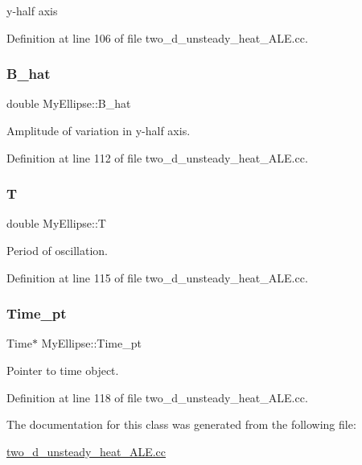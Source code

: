 y-\/half axis 



Definition at line 106 of file two\+\_\+d\+\_\+unsteady\+\_\+heat\+\_\+\+A\+L\+E.\+cc.

\mbox{\label{classMyEllipse_a39d06488447d80f16b80ed8915edf3e3}} 
\subsubsection{\texorpdfstring{B\+\_\+hat}{B\_hat}}
{\footnotesize\ttfamily double My\+Ellipse\+::\+B\+\_\+hat\hspace{0.3cm}{\ttfamily [protected]}}



Amplitude of variation in y-\/half axis. 



Definition at line 112 of file two\+\_\+d\+\_\+unsteady\+\_\+heat\+\_\+\+A\+L\+E.\+cc.

\mbox{\label{classMyEllipse_ab098069ab23bbbd8f30b0da3523dc87f}} 
\subsubsection{\texorpdfstring{T}{T}}
{\footnotesize\ttfamily double My\+Ellipse\+::T\hspace{0.3cm}{\ttfamily [protected]}}



Period of oscillation. 



Definition at line 115 of file two\+\_\+d\+\_\+unsteady\+\_\+heat\+\_\+\+A\+L\+E.\+cc.

\mbox{\label{classMyEllipse_abc1c4c863a599ce87bdff1abb9971953}} 
\subsubsection{\texorpdfstring{Time\+\_\+pt}{Time\_pt}}
{\footnotesize\ttfamily Time$\ast$ My\+Ellipse\+::\+Time\+\_\+pt\hspace{0.3cm}{\ttfamily [protected]}}



Pointer to time object. 



Definition at line 118 of file two\+\_\+d\+\_\+unsteady\+\_\+heat\+\_\+\+A\+L\+E.\+cc.



The documentation for this class was generated from the following file\+:\begin{DoxyCompactItemize}
\item 
\hyperlink{two__d__unsteady__heat__ALE_8cc}{two\+\_\+d\+\_\+unsteady\+\_\+heat\+\_\+\+A\+L\+E.\+cc}\end{DoxyCompactItemize}
